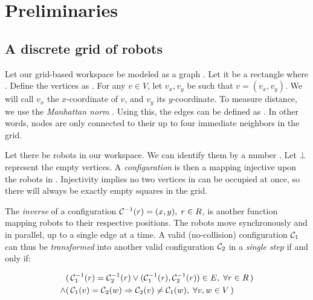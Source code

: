 \section{Preliminaries}

\subsection{A discrete grid of robots}

Let our grid-based workspace be modeled as a graph . 
Let it be a rectangle  where . 
Define the vertices as .
For any \(v \in V\), let \(v_x, v_y\) be such that \(v = (v_x, v_y)\). 
We will call \(v_x\) the \(x\)-coordinate of \(v\), and \(v_y\) its \(y\)-coordinate.
To measure distance, we use the \emph{Manhattan norm} . Using this, the edges can be defined as . In other words, nodes are only connected to their up to four immediate neighbors in the grid.

Let there be   robots in our workspace. 
We can identify them by a number . 
Let \(\bot\) represent the empty vertices.
A \emph{configuration} is then a mapping  injective upon the robots in . 
Injectivity implies no two vertices in  can be occupied at once, so there will always be exactly  empty squares in the grid.

The \emph{inverse} of a configuration \(\mathcal{C}_{}^{-1}(r) = (x, y), \; r \in R\), is another function mapping robots to their respective positions.
The robots move synchronously and in parallel, up to a single edge at a time. 
A valid (no-collision) configuration \(\mathcal{C}_{1}\) can thus be \emph{transformed} into another valid configuration \(\mathcal{C}_{2}\) in a \emph{single step} if and only if:

\begin{align}
	& (\, \mathcal{C}_{1}^{-1}(r) = \mathcal{C}_{2}^{-1}(r) \lor (\mathcal{C}_{1}^{-1}(r), \mathcal{C}_{2}^{-1}(r)) \in E, \; \forall r \in R \,)\label{req:limited_movement}\\
	\land & (\, \mathcal{C}_{1}(v) = \mathcal{C}_{2}(w) \Rightarrow \mathcal{C}_{2}(v) \neq \mathcal{C}_{1}(w), \; \forall v, w \in V \,)\label{req:no_swaps}
\end{align}

